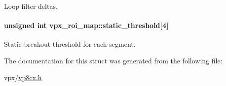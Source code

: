 Loop filter deltas. \hypertarget{structvpx__roi__map_a3354ff458e229361b53a0b2d1bf68cfb}{
\paragraph[{static\+\_\+threshold}]{\setlength{\rightskip}{0pt plus 5cm}unsigned int vpx\+\_\+roi\+\_\+map\+::static\+\_\+threshold\mbox{[}4\mbox{]}}}\label{structvpx__roi__map_a3354ff458e229361b53a0b2d1bf68cfb}
Static breakout threshold for each segment. 

The documentation for this struct was generated from the following file\+:\begin{DoxyCompactItemize}
\item 
vpx/\hyperlink{vp8cx_8h}{vp8cx.\+h}\end{DoxyCompactItemize}

